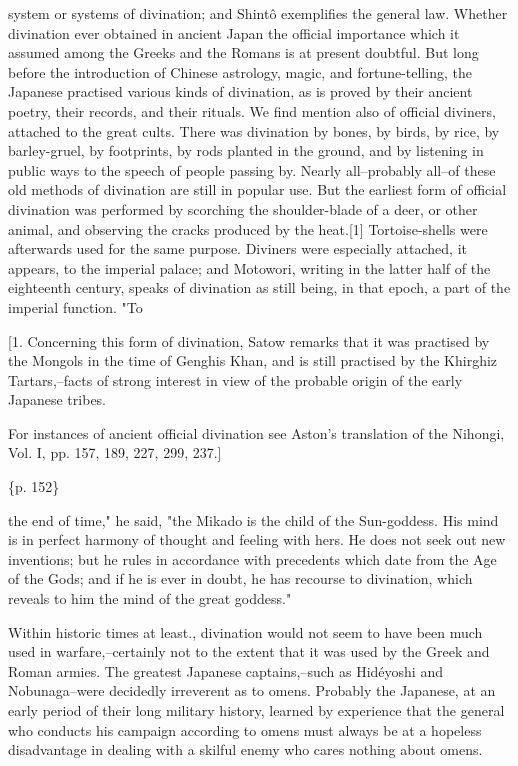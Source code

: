 system or systems of divination; and Shintô exemplifies the general law. Whether divination ever obtained in ancient Japan the official importance which it assumed among the Greeks and the Romans is at present doubtful. But long before the introduction of Chinese astrology, magic, and fortune-telling, the Japanese practised various kinds of divination, as is proved by their ancient poetry, their records, and their rituals. We find mention also of official diviners, attached to the great cults. There was divination by bones, by birds, by rice, by barley-gruel, by footprints, by rods planted in the ground, and by listening in public ways to the speech of people passing by. Nearly all--probably all--of these old methods of divination are still in popular use. But the earliest form of official divination was performed by scorching the shoulder-blade of a deer, or other animal, and observing the cracks produced by the heat.[1] Tortoise-shells were afterwards used for the same purpose. Diviners were especially attached, it appears, to the imperial palace; and Motowori, writing in the latter half of the eighteenth century, speaks of divination as still being, in that epoch, a part of the imperial function. "To

[1. Concerning this form of divination, Satow remarks that it was practised by the Mongols in the time of Genghis Khan, and is still practised by the Khirghiz Tartars,--facts of strong interest in view of the probable origin of the early Japanese tribes.

For instances of ancient official divination see Aston's translation of the Nihongi, Vol. I, pp. 157, 189, 227, 299, 237.]

\{p. 152\}

the end of time," he said, "the Mikado is the child of the Sun-goddess. His mind is in perfect harmony of thought and feeling with hers. He does not seek out new inventions; but he rules in accordance with precedents which date from the Age of the Gods; and if he is ever in doubt, he has recourse to divination, which reveals to him the mind of the great goddess."

Within historic times at least., divination would not seem to have been much used in warfare,--certainly not to the extent that it was used by the Greek and Roman armies. The greatest Japanese captains,--such as Hidéyoshi and Nobunaga--were decidedly irreverent as to omens. Probably the Japanese, at an early period of their long military history, learned by experience that the general who conducts his campaign according to omens must always be at a hopeless disadvantage in dealing with a skilful enemy who cares nothing about omens.

